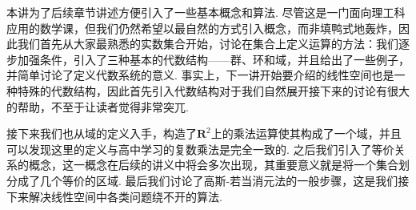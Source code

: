 \begin{summary}

    本讲为了后续章节讲述方便引入了一些基本概念和算法. 尽管这是一门面向理工科应用的数学课，但我们仍然希望以最自然的方式引入概念，而非填鸭式地轰炸，因此我们首先从大家最熟悉的实数集合开始，讨论在集合上定义运算的方法：我们逐步加强条件，引入了三种基本的代数结构——群、环和域，并且给出了一些例子，并简单讨论了定义代数系统的意义. 事实上，下一讲开始要介绍的线性空间也是一种特殊的代数结构，因此首先引入代数结构对于我们自然展开接下来的讨论有很大的帮助，不至于让读者觉得非常突兀.

    接下来我们也从域的定义入手，构造了$\mathbf{R}^2$上的乘法运算使其构成了一个域，并且可以发现这里的定义与高中学习的复数乘法是完全一致的. 之后我们引入了等价关系的概念，这一概念在后续的讲义中将会多次出现，其重要意义就是将一个集合划分成了几个等价的区域. 最后我们讨论了高斯-若当消元法的一般步骤，这是我们接下来解决线性空间中各类问题绕不开的算法.

\end{summary}

